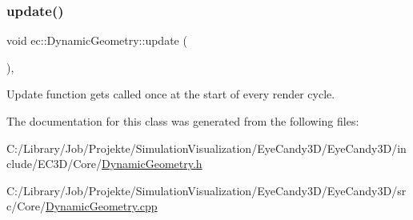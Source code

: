\subsubsection{\texorpdfstring{update()}{update()}}
{\footnotesize\ttfamily void ec\+::\+Dynamic\+Geometry\+::update (\begin{DoxyParamCaption}{ }\end{DoxyParamCaption})\hspace{0.3cm}{\ttfamily [protected]}, {\ttfamily [virtual]}}



Update function gets called once at the start of every render cycle. 



The documentation for this class was generated from the following files\+:\begin{DoxyCompactItemize}
\item 
C\+:/\+Library/\+Job/\+Projekte/\+Simulation\+Visualization/\+Eye\+Candy3\+D/\+Eye\+Candy3\+D/include/\+E\+C3\+D/\+Core/\mbox{\hyperlink{_dynamic_geometry_8h}{Dynamic\+Geometry.\+h}}\item 
C\+:/\+Library/\+Job/\+Projekte/\+Simulation\+Visualization/\+Eye\+Candy3\+D/\+Eye\+Candy3\+D/src/\+Core/\mbox{\hyperlink{_dynamic_geometry_8cpp}{Dynamic\+Geometry.\+cpp}}\end{DoxyCompactItemize}
